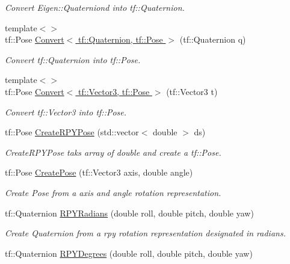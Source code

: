 \begin{DoxyCompactItemize}
\begin{DoxyCompactList}\small\item\em Convert Eigen\-::\-Quaterniond into tf\-::\-Quaternion. \end{DoxyCompactList}\item 
{\footnotesize template$<$$>$ }\\tf\-::\-Pose \hyperlink{namespaceConversion_af90de2dbc6dedc00d642e8b4e23b101d}{Convert$<$ tf\-::\-Quaternion, tf\-::\-Pose $>$} (tf\-::\-Quaternion q)
\begin{DoxyCompactList}\small\item\em Convert tf\-::\-Quaternion into tf\-::\-Pose. \end{DoxyCompactList}\item 
{\footnotesize template$<$$>$ }\\tf\-::\-Pose \hyperlink{namespaceConversion_abdf9ed550226aaab256209a1228a4965}{Convert$<$ tf\-::\-Vector3, tf\-::\-Pose $>$} (tf\-::\-Vector3 t)
\begin{DoxyCompactList}\small\item\em Convert tf\-::\-Vector3 into tf\-::\-Pose. \end{DoxyCompactList}\item 
tf\-::\-Pose \hyperlink{namespaceConversion_aed5da1073f2e617a327bb6dd4b33031d}{Create\-R\-P\-Y\-Pose} (std\-::vector$<$ double $>$ ds)
\begin{DoxyCompactList}\small\item\em Create\-R\-P\-Y\-Pose taks array of double and create a tf\-::\-Pose. \end{DoxyCompactList}\item 
tf\-::\-Pose \hyperlink{namespaceConversion_a76a8cad78c1b68f665c5a44bcd6f9b13}{Create\-Pose} (tf\-::\-Vector3 axis, double angle)
\begin{DoxyCompactList}\small\item\em Create Pose from a axis and angle rotation representation. \end{DoxyCompactList}\item 
tf\-::\-Quaternion \hyperlink{namespaceConversion_a35388c46e6dd56509e1998c48e545fd6}{R\-P\-Y\-Radians} (double roll, double pitch, double yaw)
\begin{DoxyCompactList}\small\item\em Create Quaternion from a rpy rotation representation designated in radians. \end{DoxyCompactList}\item 
tf\-::\-Quaternion \hyperlink{namespaceConversion_ae5a5fe4357248756784a320a04cc750e}{R\-P\-Y\-Degrees} (double roll, double pitch, double yaw)

\end{DoxyCompactItemize}
